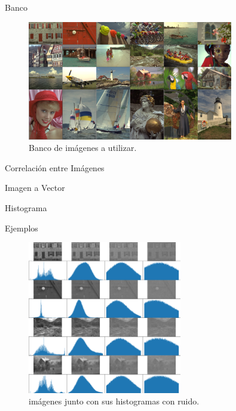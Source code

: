 \documentclass{beamer}
\begin{document}
\begin{frame}{Banco}
    \begin{figure}[H]
        \centering
        \includegraphics[width=0.8\textwidth]{all_images_grid.png}
        \caption{Banco de im\'agenes a utilizar.}
    \end{figure}        
\end{frame}

\begin{frame}{Correlaci\'on entre Im\'agenes}
    \begin{block}{Imagen a Vector}
        
    \end{block}

    \begin{block}{Histograma}
        
    \end{block}
    
\end{frame}

\begin{frame}{Ejemplos}
    \begin{figure}[H]
        \centering
        \includegraphics[width=0.6\textwidth]{img_hist_noise.png}
        \caption{im\'agenes junto con sus histogramas con ruido.}
        \label{fig:img_hist_ruido}
    \end{figure}
\end{frame}
\end{document}
